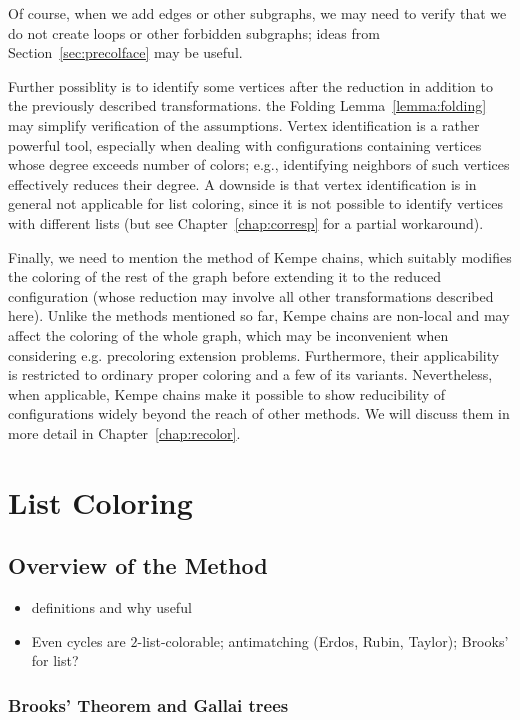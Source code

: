 \documentclass[12pt,twoside,openright,a4paper]{book}
\begin{document}
Of course, when we add edges or other subgraphs, we may need to verify that we do not create loops or other forbidden subgraphs;
ideas from Section~\ref{sec:precolface} may be useful.

Further possiblity is to identify some vertices after the reduction in addition to the previously described transformations.
the Folding Lemma~\ref{lemma:folding} may simplify verification of the assumptions.  Vertex identification is a rather powerful
tool, especially when dealing with configurations containing vertices whose degree exceeds number of colors; e.g., identifying
neighbors of such vertices effectively reduces their degree.  A downside is that vertex identification is in general not
applicable for list coloring, since it is not possible to identify vertices with different lists (but see Chapter~\ref{chap:corresp}
for a partial workaround).

Finally, we need to mention the method of Kempe chains, which suitably modifies the coloring of the rest of the graph
before extending it to the reduced configuration (whose reduction may involve all other transformations described here).
Unlike the methods mentioned so far, Kempe chains are non-local and may affect the coloring of the whole graph, which may be
inconvenient when considering e.g. precoloring extension problems.  Furthermore, their applicability is restricted to ordinary
proper coloring and a few of its variants.  Nevertheless, when applicable, Kempe chains make it possible to show reducibility
of configurations widely beyond the reach of other methods.  We will discuss them in more detail in Chapter~\ref{chap:recolor}.

\chapter{List Coloring}


\section{Overview of the Method}
\begin{itemize}
\item definitions and why useful
\item Even cycles are $2$-list-colorable; antimatching (Erdos, Rubin, Taylor); Brooks' for list?
\end{itemize}

\subsection{Brooks' Theorem and Gallai trees}\label{ssec-gallai}
\end{document}
